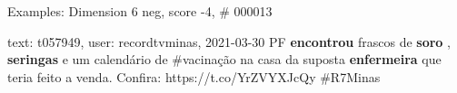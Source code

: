 \begin{frame}{Examples: Dimension 6 neg, score -4, \# 000013}
\footnotesize
\begin{alertblock}{text: t057949, user: recordtvminas, 2021-03-30}
PF \textbf{encontrou} frascos de \textbf{soro} , \textbf{seringas} e um 
calendário de \#vacinação na casa da suposta \textbf{enfermeira} que teria 
feito a venda. Confira: https://t.co/YrZVYXJcQy \#R7Minas 
\end{alertblock}
\end{frame}
